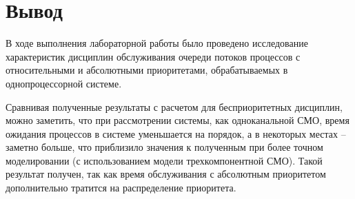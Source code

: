 \section*{Вывод}

В ходе выполнения лабораторной работы было проведено исследование характеристик дисциплин обслуживания очереди потоков процессов с относительными и абсолютными приоритетами, обрабатываемых в однопроцессорной системе.

Сравнивая полученные результаты с расчетом для бесприоритетных дисциплин, можно заметить, что при рассмотрении системы, как одноканальной СМО, время ожидания процессов в системе уменьшается на порядок, а в некоторых местах – заметно больше, что приблизило значения к полученным при более точном моделировании (с использованием модели трехкомпонентной СМО). Такой результат получен, так как время обслуживания с абсолютным приоритетом дополнительно тратится на распределение приоритета.
